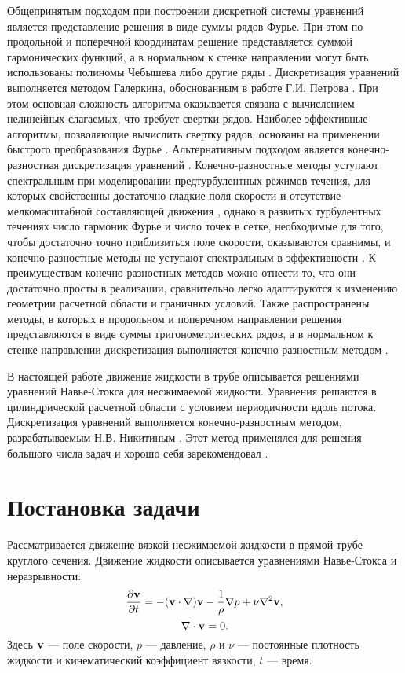 Общепринятым подходом при построении дискретной системы уравнений является представление решения в виде суммы рядов Фурье. При этом по продольной и поперечной координатам решение представляется суммой гармонических функций, а в нормальном к стенке направлении могут быть использованы полиномы Чебышева либо другие ряды \cite{Orszag1971b, Meseguer2007}. Дискретизация уравнений выполняется методом Галеркина, обоснованным в работе Г.И. Петрова \cite{Petrov1940}. При этом основная сложность алгоритма оказывается связана с вычислением нелинейных слагаемых, что требует свертки рядов. Наиболее эффективные алгоритмы, позволяющие вычислить свертку рядов, основаны на применении быстрого преобразования Фурье \cite{Cooley1965}. Альтернативным подходом является конечно-разностная дискретизация уравнений \cite{Nikitin2006}. Конечно-разностные методы уступают спектральным при моделировании предтурбулентных режимов течения, для которых свойственны достаточно гладкие поля скорости и отсутствие мелкомасштабной составляющей движения \cite{Orszag1971a}, однако в развитых турбулентных течениях число гармоник Фурье и число точек в сетке, необходимые для того, чтобы достаточно точно приблизиться поле скорости, оказываются сравнимы, и конечно-разностные методы не уступают спектральным в эффективности \cite{Rai1991}. К преимуществам конечно-разностных методов можно отнести то, что они достаточно просты в реализации, сравнительно легко адаптируются к изменению геометрии расчетной области и граничных условий. Также распространены методы, в которых в продольном и поперечном направлении решения представляются в виде суммы тригонометрических рядов, а в нормальном к стенке направлении дискретизация выполняется конечно-разностным методом \cite{Nikitin1994a}.

В настоящей работе движение жидкости в трубе описывается решениями уравнений Навье-Стокса для несжимаемой жидкости. Уравнения решаются в цилиндрической расчетной области с условием периодичности вдоль потока. Дискретизация уравнений выполняется конечно-разностным методом, разрабатываемым Н.В. Никитиным \cite{Nikitin2006}. Этот метод применялся для решения большого числа задач и хорошо себя зарекомендовал \cite{Yakhot2006a, Yakhot2006b, Holzner2008, Demekhin2013}. 

\section{Постановка задачи} \label{math_section}

Рассматривается движение вязкой несжимаемой жидкости в прямой трубе круглого сечения. Движение жидкости описывается уравнениями Навье-Стокса и неразрывности:
\begin{equation} \label{NS_eq}
\frac{\partial \mathbf{v}}{\partial t} = - (\mathbf{v} \cdot \nabla) \mathbf{v} - \frac{1}{\rho}\nabla p + \nu \nabla^2 \mathbf{v},
\end{equation}
\begin{equation} \label{div_eq}
\nabla \cdot \mathbf{v} = 0.
\end{equation}
Здесь $\mathbf{v}$ --- поле скорости, $p$ --- давление, $\rho$ и $\nu$ --- постоянные плотность жидкости и кинематический коэффициент вязкости, $t$ --- время. 

